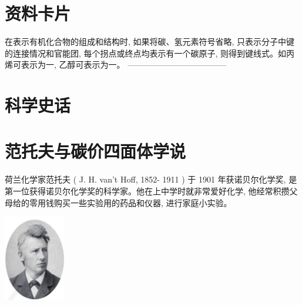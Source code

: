 \documentclass[10pt]{article}
\begin{document}
\begin{center}
\end{center}

\section*{资料卡片}

在表示有机化合物的组成和结构时, 如果将碳、氢元素符号省略, 只表示分子中键的连接情况和官能团, 每个拐点或终点均表示有一个碳原子, 则得到键线式。如丙烯可表示为一, 乙醇可表示为一。 ------------------------------------

\section*{科学史话}

\section*{范托夫与碳价四面体学说}

荷兰化学家范托夫 ( J. H. van't Hoff, 1852- 1911 ) 于 1901 年获诺贝尔化学奖, 是第一位获得诺贝尔化学奖的科学家。他在上中学时就非常爱好化学, 他经常积攒父母给的零用钱购买一些实验用的药品和仪器, 进行家庭小实验。

\begin{center}
\includegraphics[max width=0.2\textwidth]{images/0190efc5-b58a-7c43-bfb0-e0a030df9cfd_15_986936.jpg}
\end{center}
\end{document}
